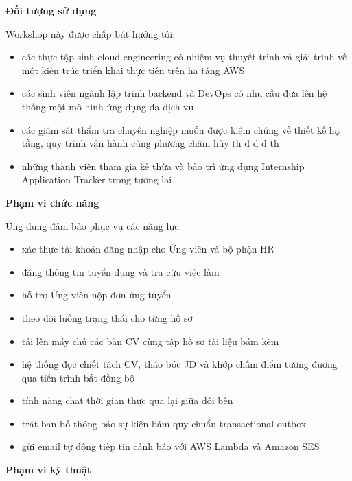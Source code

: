 \vspace{0.5em}\noindent\textbf{Đối tượng sử
dụng}\par

Workshop này được chấp bút hướng tới:

\begin{itemize}
\tightlist
\item
  các thực tập sinh cloud engineering có nhiệm vụ thuyết trình và giải
  trình về một kiến trúc triển khai thực tiễn trên hạ tầng AWS
\item
  các sinh viên ngành lập trình backend và DevOps có nhu cầu đưa lên hệ
  thống một mô hình ứng dụng đa dịch vụ
\item
  các giám sát thẩm tra chuyên nghiệp muốn được kiểm chứng về thiết kế
  hạ tầng, quy trình vận hành cùng phương châm hủy th d d d th
\item
  những thành viên tham gia kế thừa và bảo trì ứng dụng Internship
  Application Tracker trong tương lai
\end{itemize}

\vspace{0.5em}\noindent\textbf{Phạm vi chức năng}\par

Ứng dụng đảm bảo phục vụ các năng lực:

\begin{itemize}
\tightlist
\item
  xác thực tài khoản đăng nhập cho Ứng viên và bộ phận HR
\item
  đăng thông tin tuyển dụng và tra cứu việc làm
\item
  hỗ trợ Ứng viên nộp đơn ứng tuyển
\item
  theo dõi luồng trạng thái cho từng hồ sơ
\item
  tải lên máy chủ các bản CV cùng tập hồ sơ tài liệu bám kèm
\item
  hệ thống đọc chiết tách CV, tháo bóc JD và khớp chấm điểm tương đương
  qua tiến trình bất đồng bộ
\item
  tính năng chat thời gian thực qua lại giữa đôi bên
\item
  trát ban bố thông báo sự kiện bám quy chuẩn transactional outbox
\item
  gửi email tự động tiếp tin cảnh báo với AWS Lambda và Amazon SES
\end{itemize}

\vspace{0.5em}\noindent\textbf{Phạm vi kỹ thuật}\par

